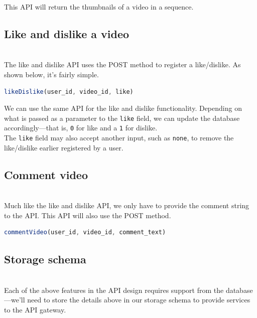 This API will return the thumbnails of a video in a sequence.

\subsection{Like and dislike a video}\label{URk-AHVo1OD5pGYoFr50s}
\\
The like and dislike API uses the POST method to register a like/dislike. As shown below, it's fairly simple.

\begin{lstlisting}[language=JavaScript]
likeDislike(user_id, video_id, like)
\end{lstlisting}

We can use the same API for the like and dislike functionality. Depending on what is passed as a parameter to the \texttt{like} field, we can update the database accordingly---that is, \texttt{0} for like and a \texttt{1} for dislike.
\\
The \texttt{like} field may also accept another input, such as \texttt{none}, to remove the like/dislike earlier registered by a user.

\subsection{Comment video}\label{oTXP3UGPG3QyOHVPTBwSe}
\\
Much like the like and dislike API, we only have to provide the comment string to the API. This API will also use the POST method.

\begin{lstlisting}[language=JavaScript]
commentVideo(user_id, video_id, comment_text)
\end{lstlisting}

\begin{table}[htbp]
\centering
\small
{}
\end{table}

\subsection{Storage schema}\label{6b5Kwut1ciUV4oImHprh8}
\\
Each of the above features in the API design requires support from the database---we'll need to store the details above in our storage schema to provide services to the API gateway.\\


